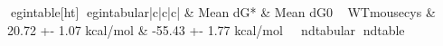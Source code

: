 egin{table}[ht]
egin{tabular}{|c|c|c|}
\hline
  & Mean dG* & Mean dG0 \
\hline
WTmousecys & 20.72 +- 1.07 kcal/mol & -55.43 +- 1.77 kcal/mol \
\hline
nd{tabular}
nd{table}
